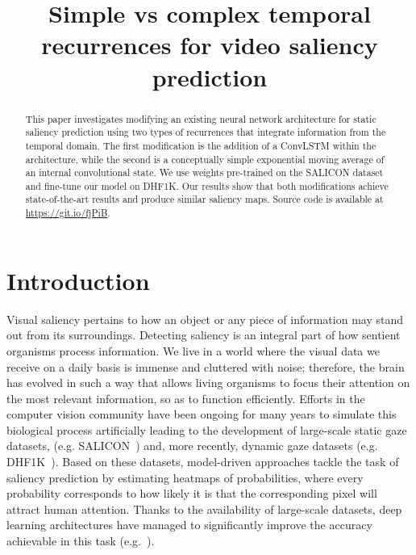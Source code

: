 \documentclass{bmvc2k}
\title{Simple vs complex temporal recurrences for video saliency prediction}
\begin{document}
\maketitle

\begin{abstract}
This paper investigates modifying an existing neural network architecture for static saliency prediction using two types of recurrences that integrate information from the temporal domain. The first modification is the addition of a ConvLSTM within the architecture, while the second is a conceptually simple exponential moving average of an internal convolutional state. We use weights pre-trained on the SALICON dataset and fine-tune our model on DHF1K. Our results show that both modifications achieve state-of-the-art results and produce similar saliency maps. Source code is available at \href{https://git.io/fjPiB}{https://git.io/fjPiB}.
\end{abstract}



\section{Introduction}
\label{sec:intro}

Visual saliency pertains to how an object or any piece of information may stand out from its surroundings. Detecting saliency is an integral part of how sentient organisms process information. We live in a world where the visual data we receive on a daily basis is immense and cluttered with noise; therefore, the brain has evolved in such a way that allows living organisms to focus their attention on the most relevant information, so as to function efficiently. Efforts in the computer vision community have been ongoing for many years to simulate this biological process artificially leading to the development of large-scale static gaze datasets, (e.g. SALICON~\cite{SALICON}) and, more recently, dynamic gaze datasets (e.g. DHF1K~\cite{Wang2018a}). Based on these datasets, model-driven approaches tackle the task of saliency prediction by estimating heatmaps of probabilities, where every probability corresponds to how likely it is that the corresponding pixel will attract human attention. Thanks to the availability of large-scale datasets, deep learning architectures have managed to significantly improve the accuracy achievable in this task (e.g.~\cite{Wang2018a,Pan2017,gorji2018going,SALICON,pan2016shallow}). 
\end{document}
